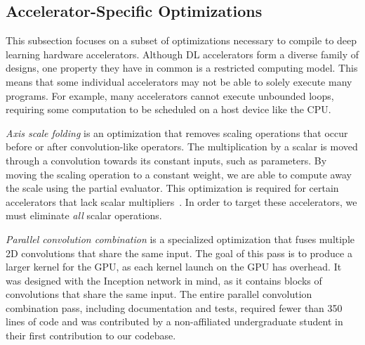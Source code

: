 \subsection{Accelerator-Specific Optimizations}
\label{sec:accel-opts}


This subsection focuses on a subset of optimizations necessary to
  compile \relay to deep learning hardware accelerators.
Although DL accelerators form a diverse family of designs,
  one property they have in common is a restricted computing model.
This means that some individual accelerators
  may not be able to solely execute many \relay programs.
For example, many accelerators cannot execute unbounded loops,
  requiring some computation to be scheduled on a host device
  like the CPU.

\textit{Axis scale folding} is an optimization that removes scaling
  operations that occur before or after convolution-like operators.
The multiplication by a scalar is moved through a convolution towards
  its constant inputs, such as parameters.
By moving the scaling operation to a constant weight, we are able
  to compute away the scale using the partial evaluator.
This optimization is required for certain accelerators that lack scalar multipliers~\citep{moreau2018vta}.
In order to target these accelerators,
  we must eliminate \textit{all} scalar operations.

\textit{Parallel convolution combination} is a specialized
  optimization that fuses multiple 2D convolutions that share the same input.
The goal of this pass is to produce a larger kernel for the GPU,
  as each kernel launch on the GPU has overhead.
It was designed with the Inception network \citep{inception} in mind, as it
  contains blocks of convolutions that share the same input.
The entire parallel convolution combination pass,
  including documentation and tests,
  required fewer than 350 lines of code and was contributed
  by a non-\relay affiliated undergraduate student
  in their first contribution to our codebase.

